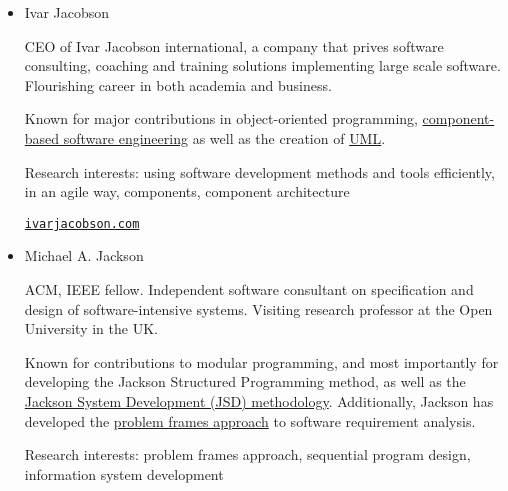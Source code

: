 \documentclass[a4paper]{article}
\begin{document}
\begin{itemize}

                \item 
                Ivar Jacobson

                CEO of Ivar Jacobson international, a company that prives software consulting, coaching and training solutions implementing large scale software. Flourishing career in both academia and business. 

                Known for major contributions in object-oriented programming, \href{https://en.wikipedia.org/wiki/Component-based_software_engineering}{component-based software engineering} as well as the creation of \href{https://en.wikipedia.org/wiki/Unified_Modeling_Language}{UML}.

                
                Research interests: using software development methods and tools efficiently, in an agile way, components, component architecture

                \href{https://www.ivarjacobson.com/}{\texttt{ivarjacobson.com}}


                \item
                Michael A. Jackson

                ACM, IEEE fellow.
                Independent software consultant on specification and design of software-intensive systems.
                Visiting research professor at the Open University in the UK.

                Known for contributions to modular programming, and most importantly for developing the Jackson Structured Programming method, as well as the \href{https://en.wikipedia.org/wiki/Jackson_system_development}{Jackson System Development (JSD) methodology}.
                Additionally, Jackson has developed the \href{https://en.wikipedia.org/wiki/Problem_frames_approach}{problem frames approach} to software requirement analysis.

                Research interests: problem frames approach, sequential program design, information system development


\end{itemize}
\end{document}
